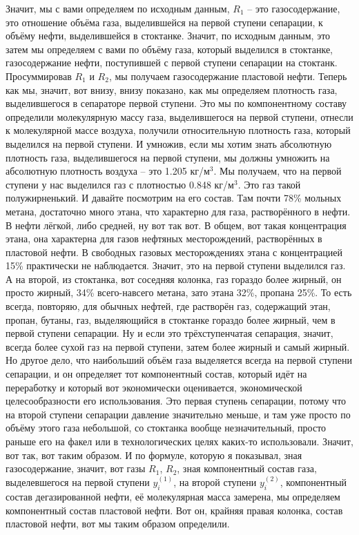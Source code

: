 \documentclass[main.tex]{subfiles}
\begin{document}
Значит, мы с вами определяем по исходным данным, $R_1$ -- это
газосодержание, это отношение объёма газа, выделившейся на первой ступени сепарации, к объёму нефти, выделившейся в стоктанке.
Значит, по исходным данным, это затем мы определяем с вами по объёму газа, который выделился в стоктанке, газосодержание нефти, поступившей с первой ступени сепарации на стоктанк.
Просуммировав $R_1$ и $R_2$, мы получаем газосодержание пластовой нефти.
Теперь как мы, значит, вот внизу, внизу показано, как мы определяем плотность газа, выделившегося в сепараторе первой ступени.
Это мы по компонентному составу определили молекулярную массу газа, выделившегося на первой ступени, отнесли к молекулярной массе воздуха, получили относительную плотность газа, который выделился на первой ступени.
И умножив, если мы хотим знать абсолютную плотность газа, выделившегося на первой ступени, мы должны умножить на абсолютную плотность воздуха -- это 1.205 кг/м$^3$.
Мы получаем, что на первой ступени у нас выделился газ с плотностью 0.848 кг/м$^3$.
Это газ такой полужирненький.
И давайте посмотрим на его состав.
Там почти 78\% мольных метана, достаточно много этана, что характерно для газа, растворённого в нефти.
В нефти лёгкой, либо средней, ну вот так вот.
В общем, вот такая концентрация этана, она характерна для газов нефтяных месторождений, растворённых в пластовой нефти.
В свободных газовых месторождениях этана с концентрацией 15\% практически не наблюдается.
Значит, это на первой ступени выделился газ.
А на второй, из стоктанка, вот соседняя колонка, газ гораздо более жирный, он просто жирный, 34\% всего-навсего метана, зато этана 32\%, пропана 25\%.
То есть всегда, повторяю, для обычных нефтей, где растворён газ, содержащий этан, пропан, бутаны, газ, выделяющийся в стоктанке гораздо более жирный, чем в первой ступени сепарации.
Ну и если это трёхступенчатая сепарация, значит, всегда более сухой газ на первой ступени, затем более жирный и самый жирный.
Но другое дело, что наибольший объём газа выделяется всегда на первой ступени сепарации, и он определяет тот компонентный состав, который идёт на переработку и который вот экономически оценивается, экономической целесообразности его использования.
Это первая ступень сепарации, потому что на второй ступени сепарации давление значительно меньше, и там уже просто по объёму этого газа небольшой, со стоктанка вообще незначительный, просто раньше его на факел или в технологических целях каких-то использовали.
Значит, вот так, вот таким образом.
И по формуле, которую я показывал, зная газосодержание, значит, вот газы $R_1$, $R_2$, зная компонентный состав газа, выделевшегося на первой ступени $y_i^{(1)}$, на второй ступени $y_i^{(2)}$, компонентный состав дегазированной нефти, её молекулярная масса замерена, мы определяем компонентный состав пластовой нефти.
Вот он, крайняя правая колонка, состав пластовой нефти, вот мы таким образом определили.
\end{document}
